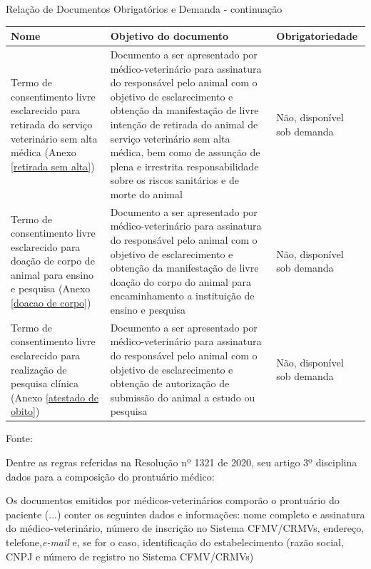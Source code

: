 \documentclass[
    12pt,               %
    openright,          %
    oneside,
    a4paper,            %
    BIBLATEX,           %
    TODO,               %
    english,            %
    brazil              %
    ]{ifsp-spo-inf-ctds}
\begin{document}

\begin{center}

    \begin{quadro}[H]
    \caption{Relação de Documentos Obrigatórios e Demanda - continuação}
    \begin{tabulary}{1.0\textwidth}{|p{10em}|p{15em}|p{10em}|}
    \hline
    Nome & Objetivo do documento & Obrigatoriedade\\
    \hline
    Termo de consentimento livre esclarecido para retirada do serviço veterinário sem alta médica (Anexo \ref{retirada sem alta}) & Documento a ser apresentado por médico-veterinário para assinatura do responsável pelo animal com o objetivo de esclarecimento e obtenção da manifestação de livre intenção de retirada do animal de serviço veterinário sem alta médica, bem como de assunção de plena e irrestrita responsabilidade sobre os riscos sanitários e de morte do animal & Não, disponível sob demanda\\
    \hline   
    Termo de consentimento livre esclarecido para doação de corpo de animal para ensino e pesquisa (Anexo \ref{doacao de corpo}) & Documento a ser apresentado por médico-veterinário para assinatura do responsável pelo animal com o objetivo de esclarecimento e obtenção da manifestação de livre doação do corpo do animal para encaminhamento a instituição de ensino e pesquisa & Não, disponível sob demanda\\
    \hline
    Termo de consentimento livre esclarecido para realização de pesquisa clínica (Anexo \ref{atestado de obito}) & Documento a ser apresentado por médico-veterinário para assinatura do responsável pelo animal com o objetivo de esclarecimento e obtenção de autorização de submissão do animal a estudo ou pesquisa & Não, disponível sob demanda\\
    \hline
    \end{tabulary}   
    \label{quad:documentos3}
    \centering
    {\footnotesize Fonte: }
    \end{quadro}
\end{center}
    
        Dentre as regras referidas na Resolução nº 1321 de 2020, seu artigo 3º disciplina dados para a composição do prontuário médico:

        \begin{citacao}
            
        
            Os documentos emitidos por médicos-veterinários comporão o prontuário do paciente (...) conter os seguintes dados e informações: nome completo e assinatura do médico-veterinário, número de inscrição no Sistema CFMV/CRMVs, endereço, telefone,\emph{e-mail} e, se for o caso, identificação do estabelecimento (razão social, CNPJ e número de registro no Sistema CFMV/CRMVs)
        \end{citacao}
\end{document}
